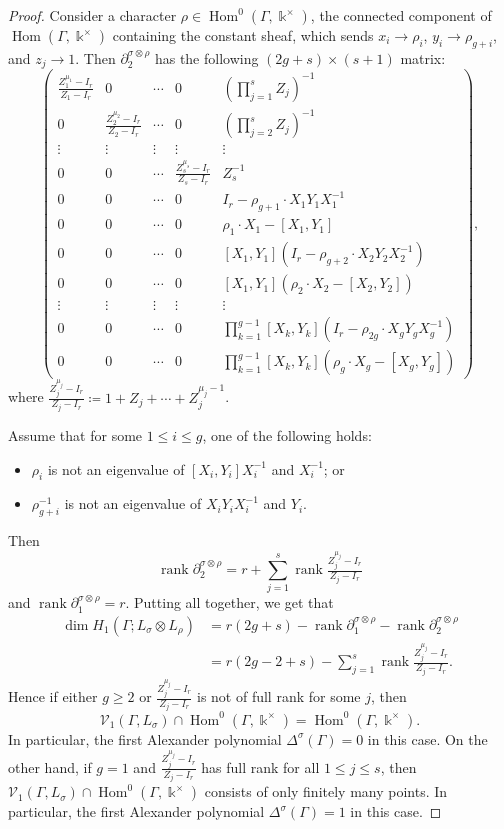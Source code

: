 \documentclass[10pt,a4paper]{amsart}
\DeclareMathOperator{\Hom}{{Hom}}
\DeclareMathOperator{\rank}{rank}
\newcommand{\VV}{\mathcal{V}}
\renewcommand{\k}{\Bbbk}
\begin{document}
\begin{proof}
Consider a character $\rho\in \Hom^0(\Gamma, \k^{\times})$, 
the connected component of $\Hom(\Gamma,\k^{\times})$ 
containing the constant sheaf, which sends $x_i\to \rho_i$, 
$y_i\to \rho_{g+i}$, and $z_j\to 1$. 
Then $\partial_2^{\sigma \otimes \rho} $ has the following 
$(2g+s)\times (s+1)$ matrix:
\[ 
\begin{pmatrix} 
\label{matrix compact bis} 
\frac{ Z_{1}^{\mu_{1}}-I_r}{ Z_{1}-I_r} & 0 & \cdots & 0 & (\prod_{j=1}^s  Z_j)^{-1} \\
0 & \frac{ Z_{2}^{\mu_{2}}-I_r}{ Z_{2}-I_r} & \cdots & 0 & (\prod_{j=2}^s  Z_j)^{-1} \\
\vdots & \vdots & \vdots & \vdots & \vdots \\
0 & 0 & \cdots & \frac{Z_{s}^{\mu_{s}}-I_r}{ Z_{s}-I_r} & Z_s^{-1} \\
0& 0 & \cdots & 0 & I_r-\rho_{g+1}\cdot X_1Y_1X_1^{-1} \\
0& 0 & \cdots & 0 & \rho_1\cdot X_1-[X_{1},Y_{1}] \\
0& 0 & \cdots & 0 & [X_1,Y_1] (I_r-\rho_{g+2}\cdot X_2Y_2X_2^{-1}) \\
0& 0 & \cdots & 0 & [X_1,Y_1] (\rho_2\cdot X_2-[X_{2},Y_{2}]) \\
\vdots& \vdots & \vdots & \vdots & \vdots \\
0& 0 & \cdots & 0 & \prod_{k=1}^{g-1}[X_k,Y_k] (I_r-\rho_{2g}\cdot X_g Y_g X_g^{-1}) \\
0& 0 & \cdots & 0 & \prod_{k=1}^{g-1}[X_k,Y_k] (\rho_g\cdot X_g-[X_{g},Y_{g}])
\end{pmatrix},
\]
where $\frac{Z_{j}^{\mu_{j}}-I_r}{Z_{j}-I_r}\coloneqq 1+Z_j+\cdots+Z_j^{\mu_j-1}$.

Assume that for some $1\leq i\leq g$, one of the following holds:
\begin{itemize}[itemsep=2pt]
\item $\rho_i$ is not an eigenvalue of $[X_i,Y_i]X_i^{-1}$ and $X_i^{-1}$; or 
\item   $\rho_{g+i}^{-1}$ is not an eigenvalue 
of $X_iY_iX_i^{-1}$ and $Y_i$.
\end{itemize}
Then
\[
\rank \partial_2^{\sigma \otimes \rho} = r+ \sum_{j=1}^s 
\rank \tfrac{Z_{j}^{\mu_{j}}-I_r}{ Z_{j}-I_r}
\]
and $\rank \partial_1^{\sigma \otimes \rho} =r$. 
 Putting all together, we get that 
\begin{align*}
    \dim H_1(\Gamma; L_\sigma\otimes L_\rho)& 
    =r(2g+s)-\rank \partial_1^{\sigma \otimes \rho} 
    -\rank \partial_2^{\sigma \otimes \rho}\\
    &=r(2g-2+s)-\sum_{j=1}^s  \rank  \tfrac{Z_{j}^{\mu_{j}}-I_r}{ Z_{j}-I_r}.
\end{align*} 
 Hence if either $g\geq 2 $ or $ \frac{Z_{j}^{\mu_{j}}-I_r}{Z_{j}-I_r}$ is 
 not of full rank for some $j$, then 
 \[
 \VV_1(\Gamma,L_\sigma)\cap \Hom^0(\Gamma,\k^{\times})= 
 \Hom^0(\Gamma,\k^{\times}).
\]
In particular, the first Alexander polynomial $\Delta^\sigma(\Gamma)=0$ in this case.
On the other hand, if $g=1$ and $ \frac{Z_{j}^{\mu_{j}}-I_r}{ Z_{j}-I_r}$ 
has full rank  for all $1\leq j \leq s$, then 
$\VV_1(\Gamma,L_\sigma)\cap \Hom^0(\Gamma,\k^{\times})$ consists 
of only finitely many points. In particular, the first Alexander polynomial 
$\Delta^\sigma(\Gamma)=1$ in this case.
\end{proof}
\end{document}
